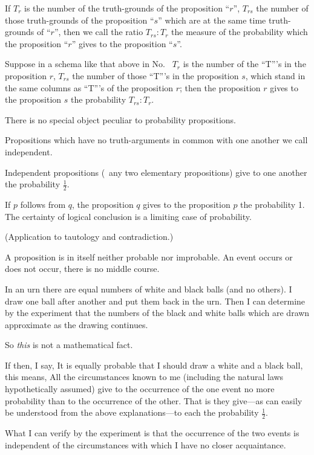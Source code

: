 {If $T_{r}$ is the number of the truth-grounds of the
proposition ``$r$'', $T_{rs}$ the number of those truth-grounds
of the proposition ``$s$'' which are at the
same time truth-grounds of ``$r$'', then we call the
ratio $T_{rs} : T_{r}$ the measure of the probability which
the proposition ``$r$'' gives to the proposition ``$s$''.}


{Suppose in a schema like that above in No.~
$T_{r}$ is the number of the ``T'''s in the proposition
$r$, $T_{rs}$ the number of those ``T'''s in
the proposition $s$, which stand in the same columns
as ``T'''s of the proposition $r$; then the proposition
$r$ gives to the proposition $s$ the probability
$T_{rs} : T_{r}$.}


{There is no special object peculiar to probability
propositions.}


{Propositions which have no truth-arguments
in common with one another we call independent.
\enlargethispage{-3pt} %

Independent propositions (\exempliGratia\ any two elementary
propositions) give to one another the probability $\frac{1}{2}$.

If $p$ follows from $q$, the proposition $q$ gives
to the proposition $p$ the probability 1. The
certainty of logical conclusion is a limiting case
of probability.

(Application to tautology and contradiction.)}


{A proposition is in itself neither probable nor
improbable. An event occurs or does not occur,
there is no middle course.}


{In an urn there are equal numbers of white
and black balls (and no others). I draw one
ball after another and put them back in the
urn. Then I can determine by the experiment
that the numbers of the black and white balls
which are drawn approximate as the drawing
continues.

So \emph{this} is not a mathematical fact.

If then, I say, It is equally probable that
I should draw a white and a black ball, this
means, All the circumstances known to me (including
the natural laws hypothetically assumed)
give to the occurrence of the one event no more
probability than to the occurrence of the other.
That is they give---as can easily be understood
from the above explanations---to each the
probability $\frac{1}{2}$.

What I can verify by the experiment is that
the occurrence of the two events is independent
of the circumstances with which I have no closer
acquaintance.}


